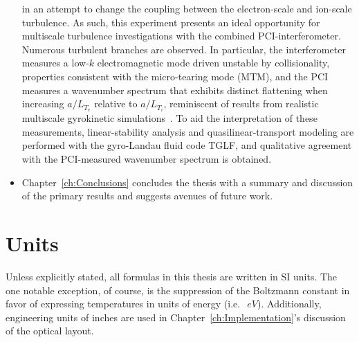 \begin{itemize}
    in an attempt to change the coupling between
    the electron-scale and ion-scale turbulence.
    As such, this experiment presents an ideal opportunity
    for multiscale turbulence investigations
    with the combined PCI-interferometer.
    Numerous turbulent branches are observed.
    In particular, the interferometer measures
    a low-$k$ electromagnetic mode driven unstable by collisionality,
    properties consistent with the micro-tearing mode (MTM), and
    the PCI measures a wavenumber spectrum
    that exhibits distinct flattening
    when increasing $a / L_{T_e}$ relative to $a / L_{T_i}$,
    reminiscent of results
    from realistic multiscale gyrokinetic simulations~\cite{howard_pp16}.
    To aid the interpretation of these measurements,
    linear-stability analysis and quasilinear-transport modeling
    are performed with the gyro-Landau fluid code TGLF, and
    qualitative agreement with the PCI-measured wavenumber spectrum
    is obtained.
  \item Chapter~\ref{ch:Conclusions} concludes the thesis
    with a summary and discussion of the primary results
    and suggests avenues of future work.
\end{itemize}


\section{Units}
Unless explicitly stated, all formulas in this thesis are written in SI units.
The one notable exception, of course,
is the suppression of the Boltzmann constant
in favor of expressing temperatures in units of energy
(i.e.\ $\SI{}{eV}$).
Additionally, engineering units of inches are used
in Chapter~\ref{ch:Implementation}'s discussion of the optical layout.




